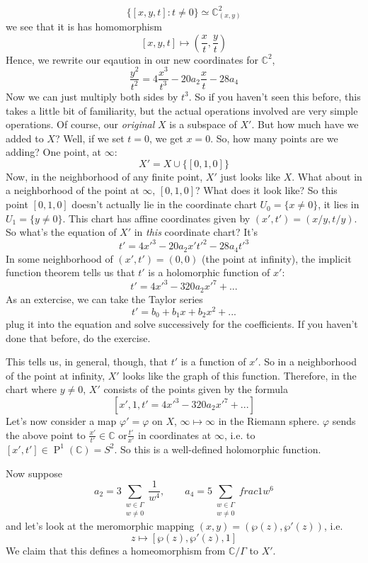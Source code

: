 \documentclass{article}
\newcommand{\mbb}[1]{\mathbb{#1}}
\DeclareMathOperator{\BigP}{P}
\newcommand{\Prj}[2]{\BigP^{#1}({#2})}
\begin{document}
\[\{[x, y, t]: t \neq 0\} \simeq \mbb{C}^2_{(x, y)}\]
we see that it is has homomorphism
\[[x, y, t] \mapsto \left(\frac{x}{t}, \frac{y}{t}\right)\]
Hence, we rewrite our eqaution in our new coordinates for \(\mbb{C}^2\),
\[\frac{y^2}{t^2} = 4\frac{x^3}{t^3} - 20a_2\frac{x}{t} - 28a_4\]
Now we can just multiply both sides by \(t^3\). So if you haven't seen this before, this takes a little bit of familiarity, but the actual operations involved are very simple operations. Of course, our \textit{original} \(X\) is a subspace of \(X'\). But how much have we added to \(X\)? Well, if we set \(t = 0\), we get \(x = 0\). So, how many points are we adding? One point, at \(\infty\):
\[X' = X \cup \{[0, 1, 0]\}\]
Now, in the neighborhood of any finite point, \(X'\) just looks like \(X\). What about in a neighborhood of the point at \(\infty\), \([0, 1, 0]\)? What does it look like?
So this point \([0, 1, 0]\) doesn't actually lie in the coordinate chart \(U_0 = \{x \neq 0\}\), it lies in \(U_1 = \{y \neq 0\}\). This chart has affine coordinates given by \((x', t') = (x/y, t/y)\). So what's the equation of \(X'\) in \textit{this} coordinate chart? It's
\[t' = 4x'^3 - 20a_2x't'^2 - 28a_4t'^3\]
In some neighborhood of \((x', t') = (0, 0)\) (the point at infinity), the implicit function theorem tells us that \(t'\) is a holomorphic function of \(x'\):
\[t' = 4x'^3 - 320a_2x'^7 + ...\]
As an extercise, we can take the Taylor series
\[t' = b_0 + b_1x + b_2x^2 + ...\]
plug it into the equation and solve successively for the coefficients. If you haven't done that before, do the exercise.

This tells us, in general, though, that \(t'\) is a function of \(x'\). So in a neighborhood of the point at infinity, \(X'\) looks like the graph of this function.
Therefore, in the chart where \(y \neq 0\), \(X'\) consists of the points given by the formula
\[[x', 1, t' = 4x'^3 - 320a_2x'^7 + ...]\]
Let's now consider a map \(\varphi' = \varphi\) on \(X\), \(\infty \mapsto \infty\) in the Riemann sphere. \(\varphi\) sends the above point to \(\frac{x'}{t'} \in \mbb{C}\) or\(\frac{t'}{x'}\) in coordinates at \(\infty\), i.e. to \([x', t'] \in \Prj{1}{\mbb{C}} = S^2\). So this is a well-defined holomorphic function.

Now suppose
\[
a_2 = 3\sum_{\substack{w \in \Gamma \\ w \neq 0}}\frac{1}{w^4},
\qquad a_4 = 5\sum_{\substack{w \in \Gamma \\ w \neq 0}}frac{1}{w^6}
\]
and let's look at the meromorphic mapping \((x, y) = (\wp(z), \wp'(z))\), i.e.
\[z \mapsto [\wp(z), \wp'(z), 1]\]
We claim that this defines a homeomorphism from \(\mbb{C}/\Gamma\) to \(X'\).
\end{document}
